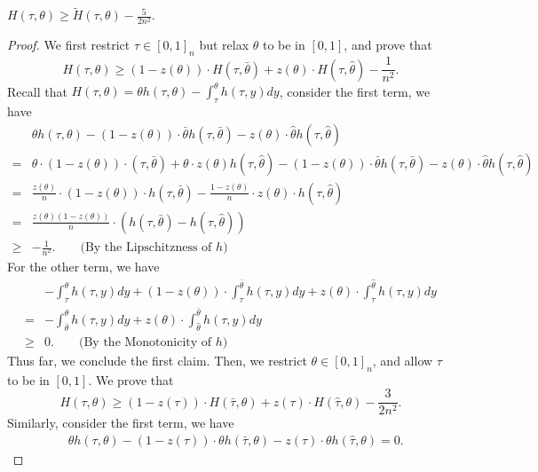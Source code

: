 \begin{lemma}
    $H(\tau,\theta) \geq \tilde{H}(\tau,\theta) - \frac{5}{2n^2}$.
\end{lemma}
\begin{proof}
    We first restrict $\tau \in [0,1]_n$ but relax $\theta$ to be in $[0,1]$, and prove that 
    $$
    H(\tau,\theta) \geq (1-z(\theta))\cdot H(\tau,\bar{\theta}) + z(\theta)\cdot H(\tau,\hat{\theta}) - \frac{1}{n^2}.
    $$
    Recall that $H(\tau,\theta) = \theta h(\tau,\theta) - \int_{\tau}^{\theta} h(\tau,y) dy$, consider the first term, we have 
    \begin{align*}
        & \theta h(\tau,\theta) - (1-z(\theta))\cdot \bar{\theta} h(\tau,\bar{\theta}) - z(\theta)\cdot \hat{\theta} h(\tau,\hat{\theta}) \\ 
        = & \theta\cdot(1-z(\theta))\cdot(\tau,\bar{\theta}) + \theta\cdot z(\theta)h(\tau,\hat{\theta}) - (1-z(\theta))\cdot \bar{\theta} h(\tau,\bar{\theta}) - z(\theta)\cdot \hat{\theta} h(\tau,\hat{\theta}) \\
        = & \frac{z(\theta)}{n} \cdot (1-z(\theta)) \cdot h(\tau,\bar{\theta}) - \frac{1-z(\theta)}{n} \cdot z(\theta) \cdot h(\tau,\hat{\theta}) \\
        = & \frac{z(\theta)(1-z(\theta))}{n} \cdot (h(\tau,\bar{\theta}) -h(\tau,\hat{\theta})) \\ 
        \geq & - \frac{1}{n^2}. \qquad \text{(By the Lipschitzness of $h$)}
    \end{align*}
    For the other term, we have
    \begin{align*}
        & - \int_{\tau}^{\theta} h(\tau,y)dy + (1-z(\theta)) \cdot \int_{\tau}^{\bar{\theta}} h(\tau,y)dy + z(\theta) \cdot \int_{\tau}^{\hat{\theta}} h(\tau,y)dy \\
        = & - \int_{\bar{\theta}}^{\theta} h(\tau,y)dy + z(\theta) \cdot \int_{\hat{\theta}}^{\bar{\theta}} h(\tau,y)dy \\
        \geq & 0. \qquad \text{(By the Monotonicity of $h$)}
    \end{align*}
    Thus far, we conclude the first claim. Then, we restrict $\theta \in [0,1]_n$, and allow $\tau$ to be in $[0,1]$. We prove that 
    $$
    H(\tau,\theta) \geq (1-z(\tau))\cdot H(\bar{\tau},\theta) + z(\tau)\cdot H(\hat{\tau},\theta) - \frac{3}{2n^2}.
    $$
    Similarly, consider the first term, we have
    \begin{align*}
        & \theta h(\tau,\theta) - (1-z(\tau))\cdot \theta h(\bar{\tau},\theta) - z(\tau)\cdot \theta h(\hat{\tau},\theta) = 0.

\end{align*}
\end{proof}
